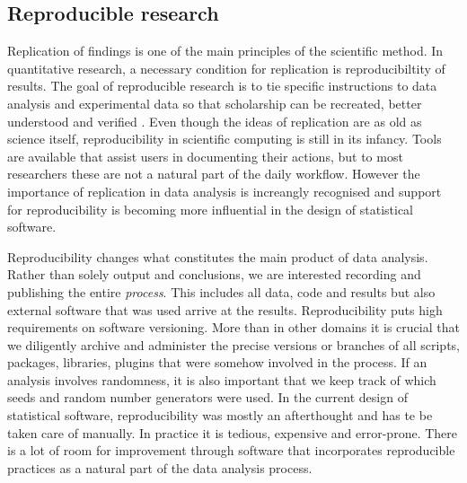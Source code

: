 \subsection{Reproducible research}

Replication of findings is one of the main principles of the scientific method. In quantitative research, a necessary condition for replication is reproducibiltity of results. The goal of reproducible research is to tie specific instructions to data analysis and experimental data so that scholarship can be recreated, better understood and verified \citep{cranRR}. Even though the ideas of replication are as old as science itself, reproducibility in scientific computing is still in its infancy. Tools are available that assist users in documenting their actions, but to most researchers these are not a natural part of the daily workflow. However the importance of replication in data analysis is increangly recognised and support for reproducibility is becoming more influential in the design of statistical software.

Reproducibility changes what constitutes the main product of data analysis. Rather than solely output and conclusions, we are interested recording and publishing the entire \emph{process}. This includes all data, code and results but also external software that was used arrive at the results. Reproducibility puts high requirements on software versioning. More than in other domains it is crucial that we diligently archive and administer the precise versions or branches of all scripts, packages, libraries, plugins that were somehow involved in the process. If an analysis involves randomness, it is also important that we keep track of which seeds and random number generators were used. In the current design of statistical software, reproducibility was mostly an afterthought and has te be taken care of manually. In practice it is tedious, expensive and error-prone. There is a lot of room for improvement through software that incorporates reproducible practices as a natural part of the data analysis process.

